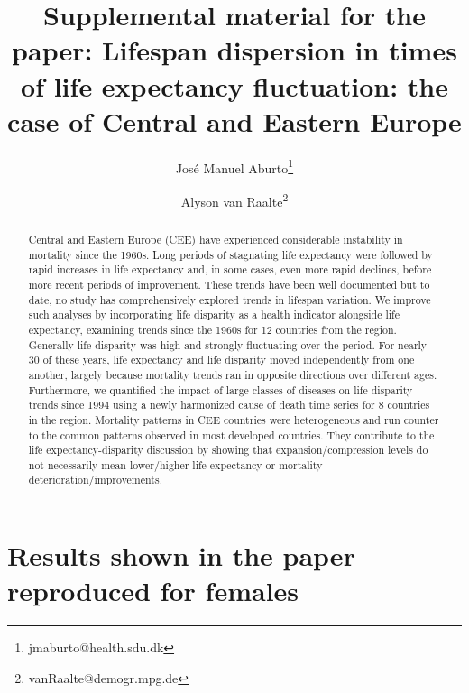 \documentclass{article}
\title{Supplemental material for the paper: Lifespan dispersion in times of life expectancy fluctuation: the case of Central and Eastern Europe}
\author[1,2]{Jos\'e Manuel Aburto\thanks{jmaburto@health.sdu.dk}}
\author[2]{Alyson van Raalte\thanks{vanRaalte@demogr.mpg.de}}
\affil[1]{Center on Population Dynamics, Department of Public Health, University of Southern Denmark}
\affil[2]{Max Planck Institute for Demographic Research}
\date{}
\begin{document}
\maketitle

\begin{abstract}
Central and Eastern Europe (CEE) have experienced considerable instability in mortality since the 1960s. Long periods of stagnating life expectancy were followed by rapid increases in life expectancy and, in some cases, even more rapid declines, before more recent periods of improvement. These trends have been well documented but to date, no study has comprehensively explored trends in lifespan variation.  We improve such analyses by incorporating life disparity as a health indicator alongside life expectancy, examining trends since the 1960s for 12 countries from the region. Generally life disparity was high and strongly fluctuating over the period. For nearly 30 of these years, life expectancy and life disparity moved independently from one another, largely because mortality trends ran in opposite directions over different ages. Furthermore, we quantified the impact of large classes of diseases on life disparity trends since 1994 using a newly harmonized cause of death time series for 8 countries in the region. Mortality patterns in CEE countries were heterogeneous and run counter to the common patterns observed in most developed countries. They contribute to the life expectancy-disparity discussion by showing that expansion/compression levels do not necessarily mean lower/higher life expectancy or mortality deterioration/improvements.
\end{abstract}


\newpage


\section*{Results shown in the paper reproduced for females}
\end{document}
